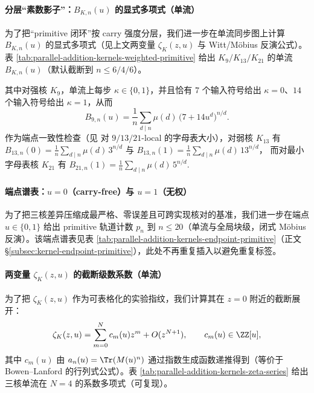 \paragraph{分层“素数影子”：\texorpdfstring{$B_{K,n}(u)$}{B\_{K,n}(u)} 的显式多项式（单流）}
为了把“primitive 闭环”按 carry 强度分层，我们进一步在单流同步图上计算 $B_{K,n}(u)$ 的显式多项式（见上文两变量 $\zeta_K(z,u)$ 与 Witt/Möbius 反演公式）。表 \ref{tab:parallel-addition-kernels-weighted-primitive} 给出 $K_9/K_{13}/K_{21}$ 的单流 $B_{K,n}(u)$（默认截断到 $n\le 6/4/6$）。
\par
其中对强核 $K_9$，单流上每步 $\kappa\in\{0,1\}$，并且恰有 $7$ 个输入符号给出 $\kappa=0$、$14$ 个输入符号给出 $\kappa=1$，从而
\[
B_{9,n}(u)=\frac{1}{n}\sum_{d\mid n}\mu(d)\,\bigl(7+14u^d\bigr)^{n/d}.
\]
作为端点一致性检查（见 \cite{FrougnyHellerPelantovaSvobodovaParallelAlgorithmsSlides} 对 $9/13/21$-local 的字母表大小），对弱核 $K_{13}$ 有
\(
B_{13,n}(0)=\frac{1}{n}\sum_{d\mid n}\mu(d)\,3^{n/d}
\)
与
\(
B_{13,n}(1)=\frac{1}{n}\sum_{d\mid n}\mu(d)\,13^{n/d}
\)，
而对最小字母表核 $K_{21}$ 有
\(
B_{21,n}(1)=\frac{1}{n}\sum_{d\mid n}\mu(d)\,5^{n/d}.
\)


\paragraph{端点谱表：\texorpdfstring{$u=0$}{u=0}（carry-free）与 \texorpdfstring{$u=1$}{u=1}（无权）}
为了把三核差异压缩成最严格、零误差且可跨实现核对的基准，我们进一步在端点 $u\in\{0,1\}$ 给出 primitive 轨道计数 $p_n$ 到 $n\le 20$（单流与全局块级，闭式 Möbius 反演）。该端点谱表见表 \ref{tab:parallel-addition-kernels-endpoint-primitive}（正文 \S\ref{subsec:kernel-endpoint-primitive}），此处不再重复插入以避免重复标签。

\paragraph{两变量 \texorpdfstring{$\zeta_K(z,u)$}{zeta(z,u)} 的截断级数系数（单流）}
为了把 $\zeta_K(z,u)$ 作为可表格化的实验指纹，我们计算其在 $z=0$ 附近的截断展开：
\[
\zeta_K(z,u)=\sum_{m=0}^{N}c_m(u)z^m+O(z^{N+1}),
\qquad c_m(u)\in\ZZ[u],
\]
其中 $c_m(u)$ 由 $a_n(u)=\Tr(M(u)^n)$ 通过指数生成函数递推得到（等价于 Bowen--Lanford 的行列式公式）。表 \ref{tab:parallel-addition-kernels-zeta-series} 给出三核单流在 $N=4$ 的系数多项式（可复现）。


